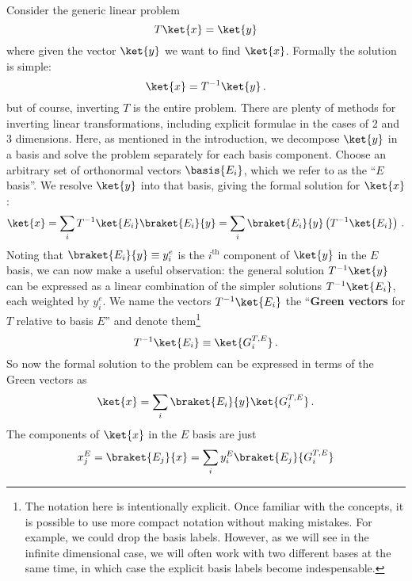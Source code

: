 
Consider the generic linear problem
\begin{equation}
  T \ket{x} = \ket{y}
\end{equation}
where given the vector $\ket{y}$ we want to find $\ket{x}$.
Formally the solution is simple:
\begin{equation}
  \ket{x} = T^{-1} \ket{y}
  \, .
\end{equation}
but of course, inverting $T$ is the entire problem.
There are plenty of methods for inverting linear transformations, including explicit formulae in the cases of 2 and 3 dimensions.
Here, as mentioned in the introduction, we decompose $\ket{y}$ in a basis and solve the problem separately for each basis component.
Choose an arbitrary set of orthonormal vectors $\basis{E_i}$, which we refer to as the ``$E$ basis''.
We resolve $\ket{y}$ into that basis, giving the formal solution for $\ket{x}$:
\begin{equation}
  \ket{x} = \sum_i T^{-1} \ket{E_i} \braket{E_i}{y}
  = \sum_i \braket{E_i}{y} \left( T^{-1} \ket{E_i} \right)
  \, .
\end{equation}
Noting that $\braket{E_i}{y} \equiv y_i^e$ is the $i^\text{th}$ component of $\ket{y}$ in the $E$ basis, we can now make a useful observation: the general solution $T^{-1}\ket{y}$ can be expressed as a linear combination of the simpler solutions $T^{-1}\ket{E_i}$, each weighted by $y_i^e$.
We name the vectors $T^{-1}\ket{E_i}$ the ``\textbf{Green vectors} for $T$ relative to basis $E$'' and denote them\footnote{The notation here is intentionally explicit.
Once familiar with the concepts, it is possible to use more compact notation without making mistakes. For example, we could drop the basis labels. However, as we will see in the infinite dimensional case, we will often work with two different bases at the same time, in which case the explicit basis labels become indespensable.}
\begin{equation}
  T^{-1} \ket{E_i} \equiv \ket{G^{T,E}_i}
  \, .
\end{equation}
So now the formal solution to the problem can be expressed in terms of the Green vectors as
\begin{equation}
  \ket{x} = \sum_i \braket{E_i}{y} \ket{G_i^{T,E}}
  \label{eq:green_vector_expansion}
  \, .
\end{equation}
The components of $\ket{x}$ in the $E$ basis are just
\begin{equation}
  x_j^E = \braket{E_j}{x} = \sum_i y_i^E \braket{E_j}{G_i^{T, E}}
\end{equation}
